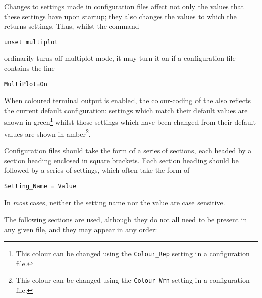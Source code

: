 Changes to settings made in configuration files affect not only the values that
these settings have upon startup; they also changes the values to which the
 returns settings. Thus, whilst the command
\begin{verbatim}
unset multiplot
\end{verbatim}
ordinarily turns off multiplot mode, it may turn it on if a configuration file
contains the line
\begin{verbatim}
MultiPlot=On
\end{verbatim}
When coloured terminal output is enabled, the colour-coding of the
 also reflects the current default configuration: settings which
match their default values are shown in green\footnote{This colour can be
changed using the {\tt Colour\_Rep} setting in a configuration file.} whilst
those settings which have been changed from their default values are shown in
amber\footnote{This colour can be changed using the {\tt Colour\_Wrn} setting
in a configuration file.}.

Configuration files should take the form of a series of sections, each headed
by a section heading enclosed in square brackets. Each section heading should
be followed by a series of settings, which often take the form of
\begin{verbatim}
Setting_Name = Value
\end{verbatim}
In {\it most} cases, neither the setting name nor the value are case sensitive.

The following sections are used, although they do not all need to be present in
any given file, and they may appear in any order:

